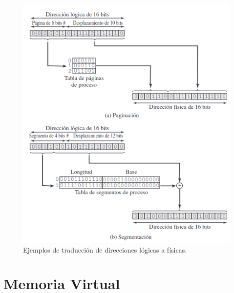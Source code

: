\documentclass[12pt,a4paper]{article}
\begin{document}
\begin{figure}[H]
    \centering
    \includegraphics[width=15cm]{segmentacion.png}
    \caption{Ejemplos de traducción de direcciones lógicas a físicas.}
\end{figure}

\section{Memoria Virtual}
\end{document}

